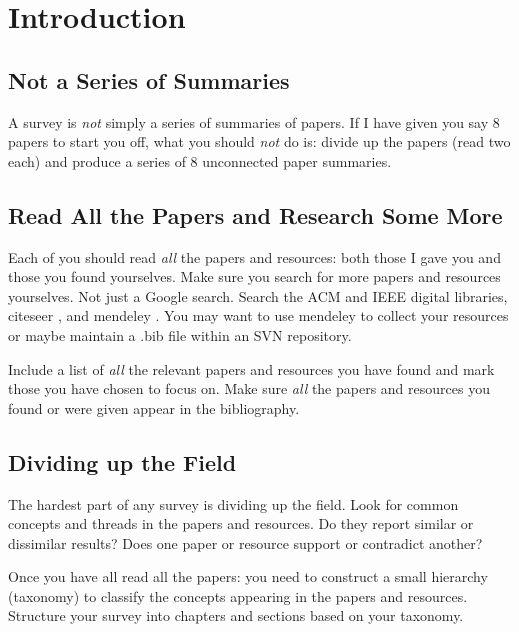 %
%
% 
% 
% 


\chapter{Introduction}

\label{chap:Intro}






\section{Not a Series of Summaries}

A survey is \emph{not} simply a series of summaries of papers.
If I have given you say 8 papers to start you off, what you should
\emph{not} do is: divide up the papers (read two each) and produce a
series of 8 unconnected paper summaries.




\section{Read All the Papers and Research Some More}

Each of you should read \emph{all} the papers and resources: both
those I gave you and those you found yourselves.
%
Make sure you search for more papers and resources yourselves. Not
just a Google search. Search the ACM \citep{ACM-DL} and IEEE
\citep{IEEE-DL} digital libraries, citeseer \citep{CiteSeer}, and
mendeley \citep{Mendeley}. You may want to use mendeley to collect
your resources or maybe maintain a .bib file within an SVN repository.

Include a list of \emph{all} the relevant papers and resources you
have found and mark those you have chosen to focus on. Make sure
\emph{all} the papers and resources you found or were given appear in
the bibliography.




\section{Dividing up the Field}

The hardest part of any survey is dividing up the field.  Look for
common concepts and threads in the papers and resources. Do they
report similar or dissimilar results? Does one paper or resource
support or contradict another?

Once you have all read all the papers: you need to construct a small
hierarchy (taxonomy) to classify the concepts appearing in the papers
and resources. Structure your survey into chapters and sections based
on your taxonomy.